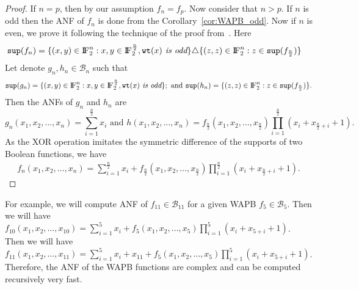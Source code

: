 \documentclass{article}[12pt]
\newcommand{\FF}{{\rm I\!F}}
\newcommand{\CB}{\mathcal{B}}
\newcommand{\wt}{\mathtt{wt}}
\newcommand{\spt}{\mathtt{sup}}
\begin{document}
 \begin{proof}
If $n = p$, then by our assumption $f_n = f_p$. Now consider that $n > p$. If $n$ is odd then the ANF of $f_n$ is done from the Corollary~\ref{cor:WAPB_odd}.
Now if $n$ is even, we prove it following the technique of the proof from~\cite[Theorem 4]{MS21}. Here 
\begin{align*}
\spt(f_n) & = \{(x,y) \in \FF_2^n : x,y \in \FF_2^{\frac{n}{2}}, \wt(x) \textit{ is odd}\} \triangle \{(z,z) \in \FF_2^n : z \in \spt(f_{\frac{n}{2}})\}
\end{align*}
Let denote $g_n, h_n \in \CB_n$ such that
$$ \spt(g_n) = \{(x,y) \in \FF_2^n : x,y \in \FF_2^{\frac{n}{2}}, \wt(x) \textit{ is odd}\}; \text{ and }
\spt(h_n) = \{(z,z) \in \FF_2^n : z \in \spt(f_{\frac{n}{2}})\}.$$
Then the ANFs of $g_n$ and $h_n$ are
$$g_n(x_1,x_2, \ldots, x_n) = \sum_{i=1}^{\frac{n}{2}} x_i \text{ and } h(x_1,x_2, \ldots, x_n) = f_{\frac{n}{2}}(x_1,x_2, \ldots, x_{\frac{n}{2}}) \prod_{i=1}^{\frac{n}{2}}(x_i+x_{\frac{n}{2}+i}+1).$$
As the XOR operation imitates the symmetric difference of the supports of two Boolean functions, we have 
\begin{align*}
f_n(x_1,x_2,\ldots,x_n)=  \displaystyle{\sum_{i=1}^{\frac{n}{2}} x_{i} + f_{\frac{n}{2}}(x_1,x_2,\ldots,x_\frac{n}{2})\prod_{i=1}^{\frac{n}{2}} (x_i + x_{\frac{n}{2} + i} + 1) }.
\end{align*}
\end{proof}
For example, we will compute ANF of $f_{11} \in \CB_{11}$ for a given WAPB $f_5 \in \CB_5$.  Then we will have $f_{10}(x_1,x_2, \ldots, x_{10}) = \displaystyle{\sum_{i=1}^5 x_{i} + f_5(x_1,x_2,\ldots,x_5)\prod_{i=1}^5 (x_i + x_{5 + i} + 1) }$. Then we will have $f_{11}(x_1,x_2, \ldots, x_{11}) = \displaystyle{\sum_{i=1}^5 x_{i} +x_{11} + f_5(x_1,x_2,\ldots,x_5)\prod_{i=1}^5 (x_i + x_{5 + i} + 1)}$. Therefore, the ANF of the WAPB functions are complex and can be computed recursively very fast.
\end{document}
